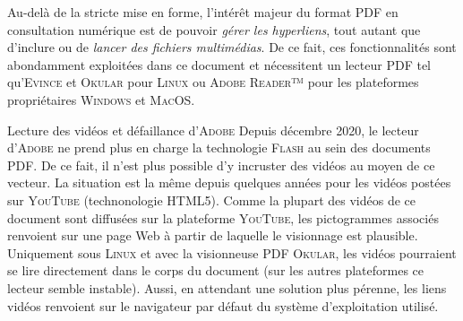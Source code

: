 Au-delà de la stricte mise en forme, l'intérêt majeur du format PDF en consultation numérique est de pouvoir \emph{gérer les hyperliens}, tout autant que d'inclure ou de \emph{lancer des fichiers multimédias}. De ce fait, ces fonctionnalités sont abondamment exploitées dans ce document et nécessitent un lecteur PDF tel qu'\textsc{Evince} et \textsc{Okular} pour \textsc{Linux} ou \textsc{Adobe Reader}™ pour les plateformes propriétaires \textsc{Windows} et \textsc{MacOS}.

\begin{marker}{Lecture des vidéos et défaillance d'\textsc{Adobe}}
Depuis décembre 2020, le lecteur d'\textsc{Adobe} ne prend plus en charge la technologie \textsc{Flash} au sein des documents PDF. De ce fait, il n'est plus possible d'y incruster des vidéos au moyen de ce vecteur. La situation est la même depuis quelques années pour les vidéos postées sur \textsc{YouTube} (technonologie HTML5). Comme la plupart des vidéos de ce document sont diffusées sur la plateforme \textsc{YouTube}, les pictogrammes associés renvoient sur une page Web à partir de laquelle le visionnage est plausible. Uniquement sous \textsc{Linux} et avec la visionneuse PDF \textsc{Okular}, les vidéos pourraient se lire directement dans le corps du document (sur les autres plateformes ce lecteur semble instable). Aussi, en attendant une solution plus pérenne, les liens vidéos renvoient sur le navigateur par défaut du système d'exploitation utilisé.
\end{marker}

